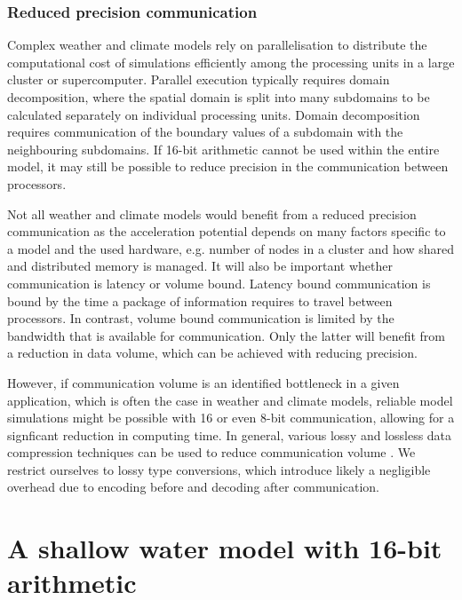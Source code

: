 \documentclass[draft]{agujournal2019}
\begin{document}
\subsubsection{Reduced precision communication}

Complex weather and climate models rely on parallelisation to distribute the
computational cost of simulations efficiently among the processing units in a
large cluster or supercomputer. Parallel execution typically requires domain
decomposition, where the spatial domain is split into many subdomains to be
calculated separately on individual processing units. Domain decomposition
requires communication of the boundary values of a subdomain with the
neighbouring subdomains. If 16-bit arithmetic cannot be used within the
entire model, it may still be possible to reduce precision in the communication
between processors.

Not all weather and climate models would benefit from a reduced precision
communication as the acceleration potential depends on many factors specific
to a model and the used hardware, e.g. number of nodes in a cluster and how
shared and distributed memory is managed. It will also be important
whether communication is latency or volume bound. Latency bound communication is
bound by the time a package of information requires to travel between processors.
In contrast, volume bound communication is limited by the bandwidth that is
available for communication. Only the latter will benefit from a reduction in data
volume, which can be achieved with reducing precision.

However, if communication volume is an identified bottleneck in a given application,
which is often the case in weather and climate models, reliable model simulations
might be possible with 16 or even 8-bit communication, allowing for a signficant
reduction in computing time. In general, various lossy and lossless data compression
techniques can be used to reduce communication volume \cite{Fan2019}. We restrict
ourselves to lossy type conversions, which introduce likely a negligible overhead
due to encoding before and decoding after communication.

\section{A shallow water model with 16-bit arithmetic}
\label{sec:swm}
\end{document}
